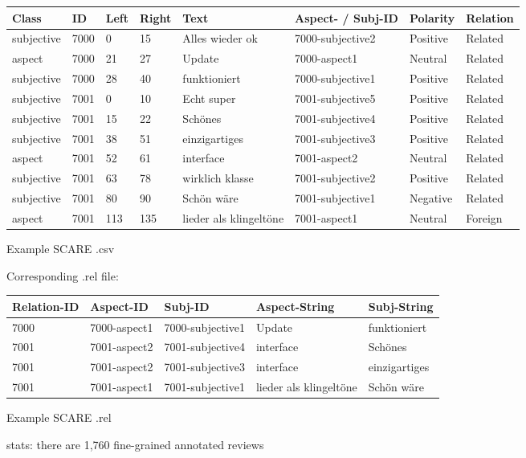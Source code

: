 {\begin{tabular}{llllllll}
	Class & ID & Left & Right & Text & Aspect- / Subj-ID & Polarity & Relation  \\
	\hline
	subjective & 7000 & 0 & 15 & Alles wieder ok & 7000-subjective2 & Positive & Related \\
	aspect & 7000 & 21 & 27 & Update & 7000-aspect1 & Neutral & Related \\
	subjective & 7000 & 28 & 40 & funktioniert & 7000-subjective1 & Positive & Related \\
	subjective & 7001 & 0 & 10 & Echt super & 7001-subjective5 & Positive & Related \\
	subjective & 7001 & 15 & 22 & Schönes & 7001-subjective4 & Positive & Related \\
	subjective & 7001 & 38 & 51 & einzigartiges & 7001-subjective3 & Positive & Related \\
	aspect & 7001 & 52 & 61 & interface & 7001-aspect2 & Neutral & Related \\
	subjective & 7001 & 63 & 78 & wirklich klasse & 7001-subjective2 & Positive & Related \\
	subjective & 7001 & 80 & 90 & Schön wäre & 7001-subjective1 & Negative & Related \\
	aspect & 7001 & 113 & 135 & lieder als klingeltöne & 7001-aspect1 & Neutral & Foreign \\
\end{tabular}
}{Example SCARE .csv}

Corresponding .rel file:

{\begin{tabular}{lllll}
	Relation-ID & Aspect-ID & Subj-ID & Aspect-String & Subj-String \\
	\hline
	7000 & 7000-aspect1 & 7000-subjective1 & Update & funktioniert \\
	7001 & 7001-aspect2 & 7001-subjective4 & interface & Schönes \\
	7001 & 7001-aspect2 & 7001-subjective3 & interface & einzigartiges \\
	7001 & 7001-aspect1 & 7001-subjective1 & lieder als klingeltöne & Schön wäre \\
\end{tabular}
}{Example SCARE .rel}


stats: there are 1,760 fine-grained annotated reviews


